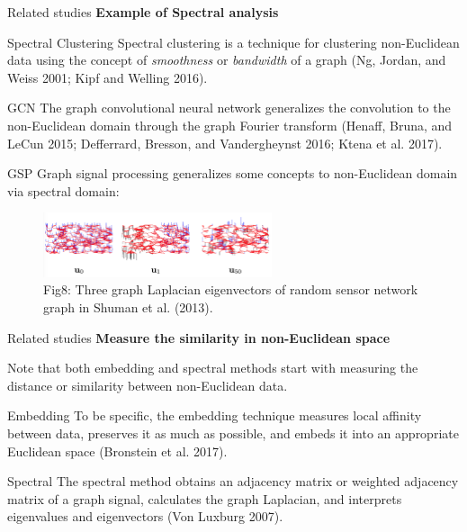 \documentclass[
  ignorenonframetext,
]{beamer}
\begin{document}
\begin{frame}{Related studies}
\label{related-studies-3}
\textbf{Example of Spectral analysis}

\begin{block}{Spectral Clustering}
Spectral clustering is a technique for clustering non-Euclidean data
using the concept of \emph{smoothness} or \emph{bandwidth} of a graph
(Ng, Jordan, and Weiss 2001; Kipf and Welling 2016).
\end{block}

\begin{block}{GCN}
The graph convolutional neural network generalizes the convolution to
the non-Euclidean domain through the graph Fourier transform (Henaff,
Bruna, and LeCun 2015; Defferrard, Bresson, and Vandergheynst 2016;
Ktena et al. 2017).
\end{block}

\begin{block}{GSP}
Graph signal processing generalizes some concepts to non-Euclidean
domain via spectral domain:

\begin{figure}[H]

{\centering \includegraphics[width=0.6\textwidth,height=\textheight]{Beamer_files/figure-beamer/9796933e-0d46-4bf7-b743-4861031e15a2-1-639b753d-8966-45d6-a836-b805dbefc704.png}

}

\caption{Fig8: Three graph Laplacian eigenvectors of random sensor
network graph in Shuman et al. (2013).}

\end{figure}%
\end{block}
\end{frame}

\begin{frame}{Related studies}
\label{related-studies-4}
\textbf{Measure the similarity in non-Euclidean space}

Note that both embedding and spectral methods start with measuring the
distance or similarity between non-Euclidean data.

\begin{block}{Embedding}
To be specific, the embedding technique measures local affinity between
data, preserves it as much as possible, and embeds it into an
appropriate Euclidean space (Bronstein et al. 2017).
\end{block}

\begin{block}{Spectral}
The spectral method obtains an adjacency matrix or weighted adjacency
matrix of a graph signal, calculates the graph Laplacian, and interprets
eigenvalues and eigenvectors (Von Luxburg 2007).
\end{block}
\end{frame}
\end{document}
